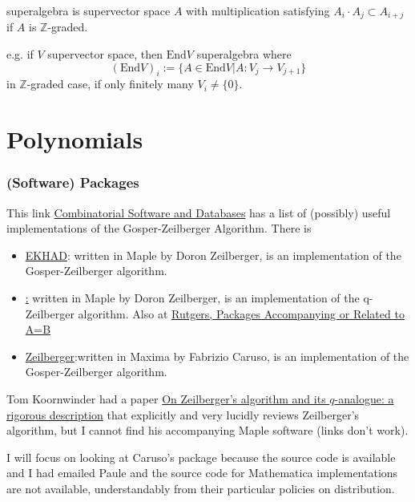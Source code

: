 \documentclass[10pt]{amsart}
\begin{document}
\begin{multicols*}{2}
superalgebra is supervector space $A$ with multiplication satisfying $A_i \cdot A_j \subset A_{i+j}$ if $A$ is $\mathbb{Z}$-graded.  

e.g. if $V$ supervector space, then $\text{End}V$ superalgebra where 
\[
(\text{End} V)_i := \lbrace A \in \text{End}V | A:V_j \to V_{j+1} \rbrace
\]
in $\mathbb{Z}$-graded case, if only finitely many $V_i\neq \lbrace 0 \rbrace$.  



\part{Polynomials}

\section{(Software) Packages}

This link \href{http://www.mat.univie.ac.at/~slc/divers/software.html}{Combinatorial Software and Databases} has a list of (possibly) useful implementations of the Gosper-Zeilberger Algorithm.  There is 
\begin{itemize}
\item \href{http://www.math.rutgers.edu/~zeilberg/tokhniot/EKHAD}{EKHAD}: written in Maple by Doron Zeilberger, is an implementation of the Gosper-Zeilberger algorithm.
\item \href{http://www.math.rutgers.edu/~zeilberg/tokhniot/qEKHAD}: written in Maple by Doron Zeilberger, is an implementation of the q-Zeilberger algorithm.  Also at \href{http://www.math.rutgers.edu/~zeilberg/programsAB.html}{Rutgers, Packages Accompanying or Related to A=B}
\item \href{http://www.risc.uni-linz.ac.at/research/combinat/risc/software/Zeilberger/}{Zeilberger}:written in Maxima by Fabrizio Caruso, is an implementation of the Gosper-Zeilberger algorithm.
\end{itemize}

Tom Koornwinder had a paper \href{https://staff.fnwi.uva.nl/t.h.koornwinder/art/1993/zeilbalgo.pdf}{On Zeilberger’s algorithm and its $q$-analogue: a rigorous description} that explicitly and very lucidly reviews Zeilberger's algorithm, but I cannot find his accompanying Maple software (links don't work).  

I will focus on looking at Caruso's package because the source code is available and I had emailed Paule and the source code for Mathematica implementations are not available, understandably from their particular policies on distribution.


\end{multicols*}
\end{document}
